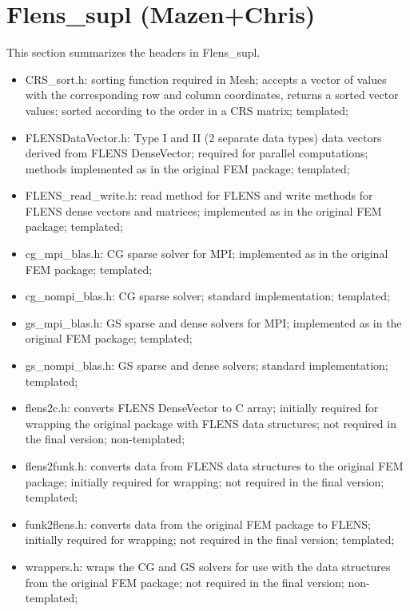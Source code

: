 \section{Flens\_supl (Mazen+Chris)}
This section summarizes the headers in Flens\_supl.
\begin{itemize}
\item CRS\_sort.h: sorting function required in Mesh; accepts a vector of values with the corresponding row and column coordinates, returns a sorted vector values; sorted according to the order in a CRS matrix; templated;
\item FLENSDataVector.h: Type I and II (2 separate data types) data vectors derived from FLENS DenseVector; required for parallel computations; methods implemented as in the original FEM package; templated;
\item FLENS\_read\_write.h: read method for FLENS and write methods for FLENS dense vectors and matrices; implemented as in the original FEM package; templated;
\item cg\_mpi\_blas.h: CG sparse solver for MPI; implemented as in the original FEM package; templated;
\item cg\_nompi\_blas.h: CG sparse solver; standard implementation; templated;
\item gs\_mpi\_blas.h: GS sparse and dense solvers for MPI; implemented as in the original FEM package; templated;
\item gs\_nompi\_blas.h: GS sparse and dense solvers; standard implementation; templated;
\item flens2c.h: converts FLENS DenseVector to C array; initially required for wrapping the original package with FLENS data structures; not required in the final version; non-templated;
\item flens2funk.h: converts data from FLENS data structures to the original FEM package; initially required for wrapping; not required in the final version; templated;
\item funk2flens.h: converts data from the original FEM package to FLENS; initially required for wrapping; not required in the final version; templated;
\item wrappers.h: wraps the CG and GS solvers for use with the data structures from the original FEM package; not required in the final version; non-templated;
\end{itemize}